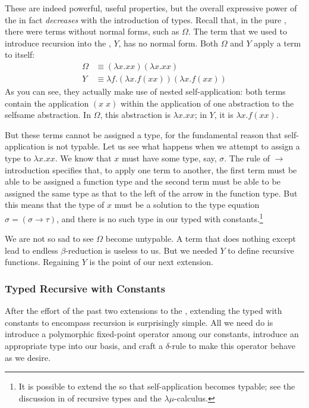 These are indeed powerful, useful properties, but the overall expressive power of the \lambdacalc in fact \emph{decreases} with the introduction of types. Recall that, in the pure \lambdacalc{}, there were terms without normal forms, such as $\Omega$. The term that we used to introduce recursion into the \lambdacalc{}, $Y$, has no normal form. Both $\Omega$ and $Y$ apply a term to itself:
\begin{align*}
\Omega &\equiv (\lambda x.xx)(\lambda x.xx)\\
Y &\equiv \lambda f.(\lambda x. f (x x))(\lambda x. f (x x))
\end{align*}
As you can see, they actually make use of nested self-ap\-pli\-ca\-tion: both terms contain the application $(x\; x)$ within the application of one abstraction to the selfsame abstraction. In $\Omega$, this abstraction is $\lambda x. xx$; in $Y$, it is $\lambda x. f (x x)$.

But these terms cannot be assigned a type, for the fundamental reason that self-ap\-pli\-ca\-tion is not typable. Let us see what happens when we attempt to assign a type to $\lambda x. x x$. We know that $x$ must have some type, say, $\sigma$. The rule of $\to$ introduction specifies that, to apply one term to another, the first term must be able to be assigned a function type and the second term must be able to be assigned the same type as that to the left of the arrow in the function type. But this means that the type of $x$ must be a solution to the type equation $\sigma = (\sigma \to \tau)$, and there is no such type in our typed \lambdacalc with constants.\footnote{It is possible to extend the \lambdacalc so that self-ap\-pli\-ca\-tion becomes typable; see the discussion in \citet[\mbox{Section 3.2, pp. 14--17}]{Barendregt:Types:1990} of recursive types and the $\lambda \mu$-calculus.}

We are not so sad to see $\Omega$ become untypable. A term that does nothing except lead to endless $\beta$-re\-duc\-tion is useless to us. But we needed $Y$ to define recursive functions. Regaining $Y$ is the point of our next extension.

\subsubsection{Typed Recursive \LambdaCalc with Constants}
After the effort of the past two extensions to the \lambdacalc, extending the typed \lambdacalc with constants to encompass recursion is surprisingly simple. All we need do is introduce a polymorphic fixed-point operator among our constants, introduce an appropriate type into our basis, and craft a $\delta$-rule to make this operator behave as we desire.

